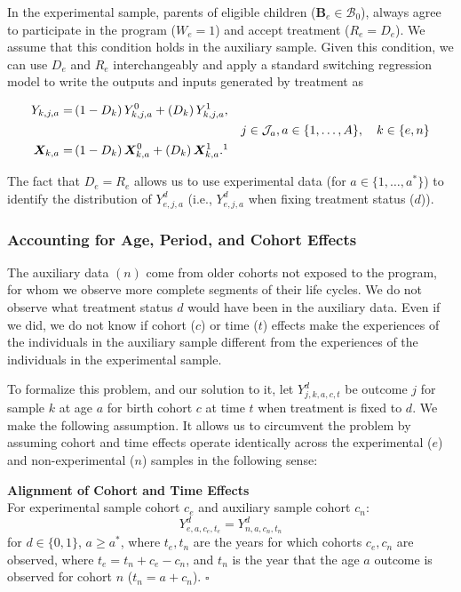 In the experimental sample, parents of eligible children ($\bm{B}_e \in \mathcal{B}_{0}$), always agree to participate in the program ($W_e = 1$) and accept treatment ($R_e = D_e$). We assume that this condition holds in the auxiliary sample. Given this condition, we can use $D_e$ and $R_e$ interchangeably and apply a standard \citet{Quandt_1972_JASA} switching regression model to write the outputs and inputs generated by treatment as
\begin{spacing}{1}
\begin{align}\label{eq:countersystem}
Y_{k,j,a} =& \left( 1 - D_k \right) Y_{k,j,a}^0 + \left( D_k \right) Y_{k,j,a}^1, \\
&&j \in \mathcal{J}_a, a \in \{1,\dots,A\}, \quad k \in \{e,n\} \nonumber \\
\bm{X}_{k,a} =& \left( 1 - D_k \right) \bm{X}_{k,a}^0 + \left( D_k \right) \bm{X}_{k,a}^1.\nonumber\footnotemark
\end{align}
\end{spacing}
\noindent The fact that $D_e = R_e$ allows us to use experimental data (for $a \in \{1, \dots,a^*\}$) to identify the distribution of $Y_{e,j,a}^d$ (i.e., $Y_{e,j,a}^d$ when fixing treatment status ($d$)).

\subsubsection{Accounting for Age, Period, and Cohort Effects}

The auxiliary data $(n)$ come from older cohorts not exposed to the program, for whom we observe more complete segments of their life cycles. We do not observe what treatment status $d$ would have been in the auxiliary data. Even if we did, we do not know if cohort ($c$) or time ($t$) effects make the experiences of the individuals in the auxiliary sample different from the experiences of the individuals in the experimental sample.

To formalize this problem, and our solution to it, let $Y_{j,k,a,c,t}^d$ be outcome $j$ for sample $k$ at age $a$ for birth cohort $c$ at time $t$ when treatment is fixed to $d$. We make the following assumption. It allows us to circumvent the problem by assuming cohort and time effects operate identically across the experimental ($e$) and non-experimental ($n$) samples in the following sense:

\onehalfspacing
\begin{assumption}\label{ass:alignment} \textbf{Alignment of Cohort and Time Effects}\\
For experimental sample cohort $c_{e}$ and auxiliary sample cohort $c_{n}$:
\begin{equation}
Y_{e,a,c_{e},t_{e}}^d = Y_{n,a,c_{n},t_{n}}^d
\end{equation}
for $d \in \{ 0, 1\}$, $a \geq a^*$, where $t_{e}, t_{n}$ are the years for which cohorts $c_{e}, c_{n}$ are observed, where $t_e = t_n + c_e - c_n$, and $t_n$ is the year that the age $a$ outcome is observed for cohort $n$ ($t_n = a + c_n$). $\square$
\end{assumption}
\doublespacing

